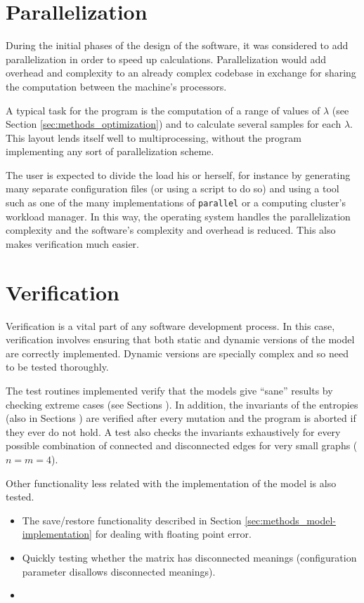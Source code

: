 \section{Parallelization}
\label{sec:methods_parallelization}

During the initial phases of the design of the software, it was considered to add parallelization in order to speed up calculations.
Parallelization would add overhead and complexity to an already complex codebase in exchange for sharing the computation between the machine's processors.

A typical task for the program is the computation of a range of values of $\lambda$ (see Section \ref{sec:methods_optimization}) and to calculate several samples for each $\lambda$.
This layout lends itself well to multiprocessing, without the program implementing any sort of parallelization scheme.

The user is expected to divide the load his or herself, for instance by generating many separate configuration files (or using a script to do so) and using a tool such as one of the many implementations of \texttt{parallel} or a computing cluster's workload manager.
In this way, the operating system handles the parallelization complexity and the software's complexity and overhead is reduced.
This also makes verification much easier.

\section{Verification}
\label{sec:methods_verification}

Verification is a vital part of any software development process.
In this case, verification involves ensuring that both static and dynamic versions of the model are correctly implemented.
Dynamic versions are specially complex and so need to be tested thoroughly.

The test routines implemented verify that the models give ``sane'' results by checking extreme cases (see Sections ).
In addition, the invariants of the entropies (also in Sections ) are verified after every mutation and the program is aborted if they ever do not hold.
A test also checks the invariants exhaustively for every possible combination of connected and disconnected edges for very small graphs ($n=m=4$).

Other functionality less related with the implementation of the model is also tested.
\begin{itemize}
\item The save/restore functionality described in Section \ref{sec:methods_model-implementation} for dealing with floating point error.
\item Quickly testing whether the matrix has disconnected meanings (configuration parameter disallows disconnected meanings).
\item 
\end{itemize}


